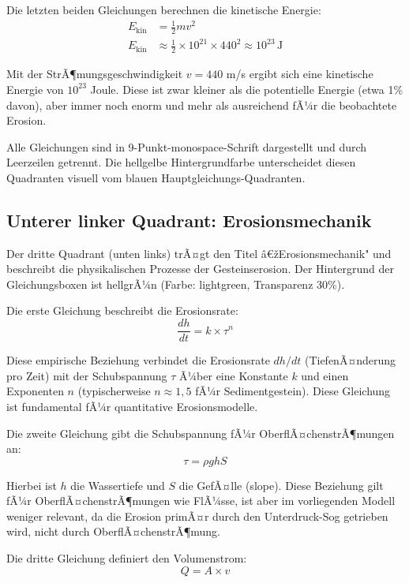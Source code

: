 ﻿\documentclass[12pt,a4paper]{report}
\begin{document}
Die letzten beiden Gleichungen berechnen die kinetische Energie:
\begin{align*}
	E_{\mathrm{kin}} &= \frac{1}{2} m v^2 \\
	E_{\mathrm{kin}} &\approx \frac{1}{2} \times 10^{21} \times 440^2 \approx 10^{23} \, \mathrm{J}
\end{align*}

Mit der StrÃ¶mungsgeschwindigkeit $v = 440$ m/s ergibt sich eine kinetische Energie von $10^{23}$ Joule. Diese ist zwar kleiner als die potentielle Energie (etwa 1\% davon), aber immer noch enorm und mehr als ausreichend fÃ¼r die beobachtete Erosion.

Alle Gleichungen sind in 9-Punkt-monospace-Schrift dargestellt und durch Leerzeilen getrennt. Die hellgelbe Hintergrundfarbe unterscheidet diesen Quadranten visuell vom blauen Hauptgleichungs-Quadranten.

\subsection{Unterer linker Quadrant: Erosionsmechanik}

Der dritte Quadrant (unten links) trÃ¤gt den Titel â€žErosionsmechanik" und beschreibt die physikalischen Prozesse der Gesteinserosion. Der Hintergrund der Gleichungsboxen ist hellgrÃ¼n (Farbe: lightgreen, Transparenz 30\%).

Die erste Gleichung beschreibt die Erosionsrate:
\begin{equation*}
	\frac{dh}{dt} = k \times \tau^n
\end{equation*}

Diese empirische Beziehung verbindet die Erosionsrate $dh/dt$ (TiefenÃ¤nderung pro Zeit) mit der Schubspannung $\tau$ Ã¼ber eine Konstante $k$ und einen Exponenten $n$ (typischerweise $n \approx 1{,}5$ fÃ¼r Sedimentgestein). Diese Gleichung ist fundamental fÃ¼r quantitative Erosionsmodelle.

Die zweite Gleichung gibt die Schubspannung fÃ¼r OberflÃ¤chenstrÃ¶mungen an:
\begin{equation*}
	\tau = \rho g h S
\end{equation*}

Hierbei ist $h$ die Wassertiefe und $S$ die GefÃ¤lle (slope). Diese Beziehung gilt fÃ¼r OberflÃ¤chenstrÃ¶mungen wie FlÃ¼sse, ist aber im vorliegenden Modell weniger relevant, da die Erosion primÃ¤r durch den Unterdruck-Sog getrieben wird, nicht durch OberflÃ¤chenstrÃ¶mung.

Die dritte Gleichung definiert den Volumenstrom:
\begin{equation*}
	Q = A \times v
\end{equation*}
\end{document}
